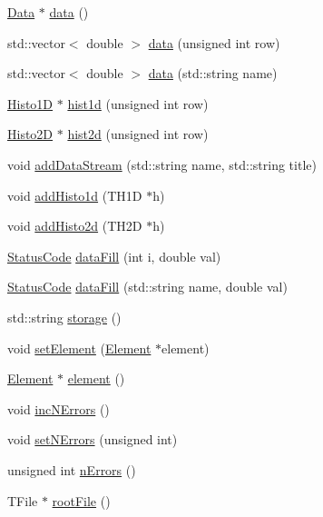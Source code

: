 \begin{DoxyCompactItemize}
\item 
\hyperlink{classData}{Data} $\ast$ \hyperlink{classProcessus_a16e45f329fbce935aeef0ff3cb508228}{data} ()
\item 
std::vector$<$ double $>$ \hyperlink{classProcessus_aa7c57483cf4b9ab0b2d0ae2de8316402}{data} (unsigned int row)
\item 
std::vector$<$ double $>$ \hyperlink{classProcessus_abf4d91fb36707e1d50178bab12d21ae9}{data} (std::string name)
\item 
\hyperlink{classHisto1D}{Histo1D} $\ast$ \hyperlink{classProcessus_a409227db936baff03c0462c1bcfe8069}{hist1d} (unsigned int row)
\item 
\hyperlink{classHisto2D}{Histo2D} $\ast$ \hyperlink{classProcessus_a73b5118cb5f2b5eaad33286183b86cfc}{hist2d} (unsigned int row)
\item 
void \hyperlink{classProcessus_a308c8f193802f1d1ab49d4447d0cb281}{addDataStream} (std::string name, std::string title)
\item 
void \hyperlink{classProcessus_ad46e0d4dfdfdcbce001ee6be1746dfa4}{addHisto1d} (TH1D $\ast$h)
\item 
void \hyperlink{classProcessus_ac1ed1aed5edaeabdf18aa56775440471}{addHisto2d} (TH2D $\ast$h)
\item 
\hyperlink{classStatusCode}{StatusCode} \hyperlink{classProcessus_a0d093b48f3218a088ba030e24372f18c}{dataFill} (int i, double val)
\item 
\hyperlink{classStatusCode}{StatusCode} \hyperlink{classProcessus_aa31ab71711f7af6a729441ff573f69c9}{dataFill} (std::string name, double val)
\item 
std::string \hyperlink{classProcessus_a33fa1a0b54a636e5cdd680669fd9ea51}{storage} ()
\item 
void \hyperlink{classProcessus_a8ddef94227d83d9dae2cd49aebc33353}{setElement} (\hyperlink{classElement}{Element} $\ast$element)
\item 
\hyperlink{classElement}{Element} $\ast$ \hyperlink{classProcessus_a6fe155527431a7190b7d44d600b9608d}{element} ()
\item 
void \hyperlink{classProcessus_abe603d0636f76db6aa6c5c60cf34c591}{incNErrors} ()
\item 
void \hyperlink{classProcessus_a831b027b9cf18ab56fa6147b5d3055da}{setNErrors} (unsigned int)
\item 
unsigned int \hyperlink{classProcessus_a82a0487f82f07cc2c2dc2731f98149e7}{nErrors} ()
\item 
TFile $\ast$ \hyperlink{classProcessus_a247e8c362ec08422cf53d08dd23b093c}{rootFile} ()

\end{DoxyCompactItemize}
